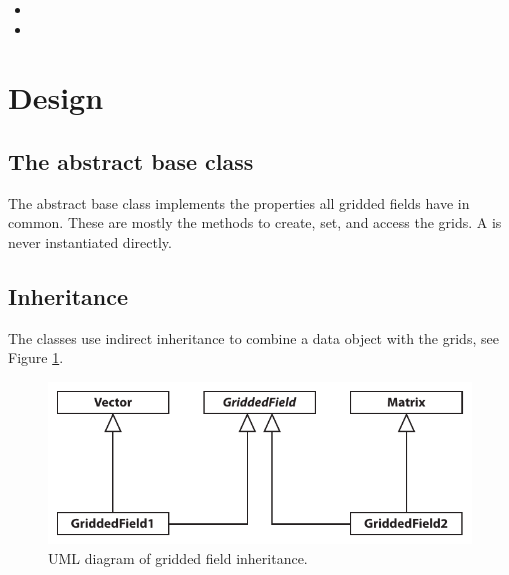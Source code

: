 \begin{itemize}
\item {}
\item {}
\end{itemize}

\section{Design}
\label{sec:griddedfields:design}



\subsection{The abstract base class }

The abstract base class  implements the properties
all gridded fields have in common. These are mostly the methods to create,
set, and access the grids. A  is never instantiated
directly.


\subsection{Inheritance}

The  classes use indirect inheritance to combine a
data object with the grids, see Figure \ref{fig:griddedfields:uml}.

\begin{figure}[ht!]
\begin{center}
\includegraphics{Figs/development/griddedfields_inheritance}
\caption{UML diagram of gridded field inheritance.}
\label{fig:griddedfields:uml}
\end{center}
\end{figure}


